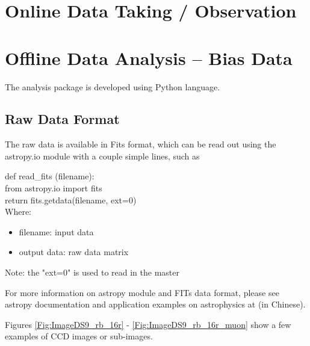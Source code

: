 \documentclass[12pt,twoside,letterpaper]{article}
\begin{document}
\section{Online Data Taking / Observation} 

\section{Offline Data Analysis -- Bias Data} 

The analysis package is developed using Python language. 

\subsection{Raw Data Format} 

The raw data is available in Fits format, which can be read out using
the astropy.io module with a couple simple lines, such as

def read\_fits (filename): \\
   \hspace{0.5cm}from astropy.io import fits \\
   \hspace{0.5cm}return fits.getdata(filename, ext=0) \\

Where:

       \begin{itemize}
           \item filename: input data
           \item output data: raw data matrix
       \end{itemize}
Note: the "ext=0" is used to read in the master


For more information on astropy module and FITs data format, please
see astropy documentation \cite{astropy} and application examples on
astrophysics at \cite{ch-astropy} (in Chinese).   

Figures \ref{Fig:ImageDS9_rb_16r} - \ref{Fig:ImageDS9_rb_16r_muon}
show a few examples of CCD images or sub-images. 
\end{document}
